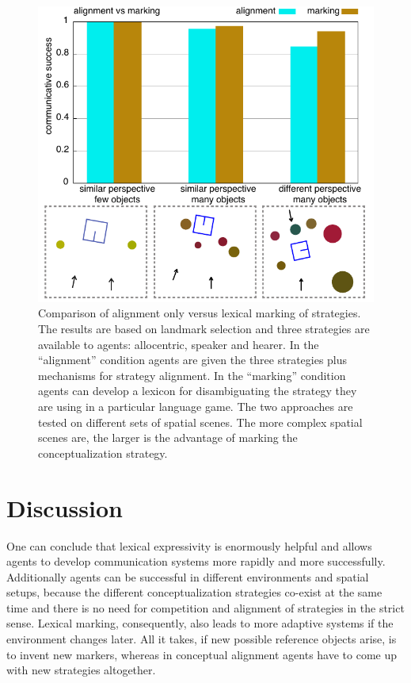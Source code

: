 \begin{figure}
\includegraphics[width=1.0\columnwidth]{figs/chunk-alignment-vs-marking-space-game-5--11}
\caption[Comparison of alignment versus lexical 
marking of strategies]{Comparison of alignment only versus lexical 
marking of strategies. The results are based on landmark selection 
and three strategies are available to agents: allocentric, 
speaker and hearer. In the ``alignment'' condition agents 
are given the three strategies plus mechanisms for strategy alignment. 
In the ``marking'' condition
agents can develop a lexicon for disambiguating the strategy 
they are using in a particular language game. The two approaches 
are tested on different sets of spatial scenes.
The more complex spatial scenes are, the larger is
the advantage of marking the conceptualization
strategy.}
\label{f:alignment-vs-marking}
\end{figure}
 
\section{Discussion}
One can conclude that lexical expressivity is enormously 
helpful and allows agents to develop 
communication systems more rapidly and more successfully. 
Additionally agents can be successful in different environments 
and spatial setups, because the different conceptualization
strategies co-exist at the same time and there is no need for 
competition and alignment of strategies 
in the strict sense. Lexical marking, consequently, also leads to 
more adaptive systems if the environment
changes later. All it takes, if new possible reference objects 
arise, is to invent new markers, whereas
in conceptual alignment agents have to come up with new strategies altogether. 


